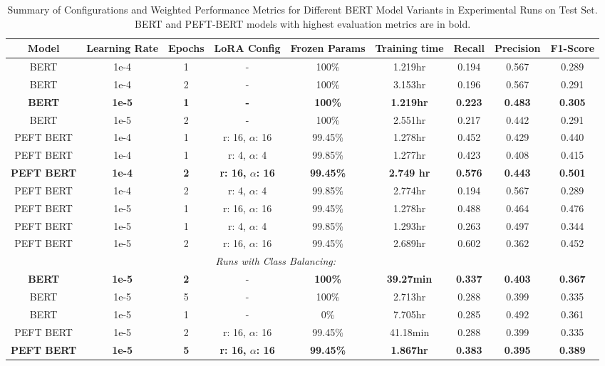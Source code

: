 \documentclass[sigconf, natbib=true]{acmart}
\begin{document}
\begin{table}[h]
\centering
\caption{Summary of Configurations and Weighted Performance Metrics for Different BERT Model Variants in Experimental Runs on Test Set. BERT and PEFT-BERT models with highest evaluation metrics are in bold.}
\label{tab:experimental_runs_test}
\begin{tabular}{c c c c c c c c c}
\toprule
\textbf{Model} & \textbf{Learning Rate} & \textbf{Epochs} & \textbf{LoRA Config} & \textbf{Frozen Params} & \textbf{Training time} & \textbf{Recall} & \textbf{Precision} & \textbf{F1-Score} \\ 
\midrule
BERT & 1e-4 & 1 & - & 100\% & 1.219hr & 0.194 & 0.567 & 0.289 \\ 
BERT & 1e-4 & 2 & - & 100\%  & 3.153hr & 0.196 & 0.567 & 0.291 \\
\textbf{BERT} & \textbf{1e-5} & \textbf{1} & \textbf{-} & \textbf{100\%} & \textbf{1.219hr} & \textbf{0.223} & \textbf{0.483} &  \textbf{0.305} \\ 
BERT & 1e-5 & 2 & - & 100\%  & 2.551hr & 0.217 & 0.442 & 0.291 \\ 
PEFT BERT & 1e-4 & 1 & r: 16, $\alpha$: 16 & 99.45\% & 1.278hr & 0.452 & 0.429 & 0.440\\ 
PEFT BERT & 1e-4 & 1 & r: 4, $\alpha$: 4 & 99.85\% & 1.277hr & 0.423 & 0.408 & 0.415 \\ 
\textbf{PEFT BERT} & \textbf{1e-4} & \textbf{2} & \textbf{r: 16, $\alpha$: 16} & \textbf{99.45\%} & \textbf{2.749 hr} & \textbf{0.576} & \textbf{0.443} &  \textbf{0.501} \\ 
PEFT BERT & 1e-4 & 2 & r: 4, $\alpha$: 4 & 99.85\% & 2.774hr & 0.194 & 0.567 &  0.289 \\ 
PEFT BERT & 1e-5 & 1 & r: 16, $\alpha$: 16 & 99.45\%  & 1.278hr & 0.488 & 0.464 & 0.476 \\ 
PEFT BERT & 1e-5 & 1 & r: 4, $\alpha$: 4 & 99.85\%  & 1.293hr & 0.263 & 0.497 & 0.344 \\ 
PEFT BERT & 1e-5 & 2 & r: 16, $\alpha$: 16 & 99.45\% & 2.689hr & 0.602 & 0.362 &  0.452 \\ 
\midrule
\multicolumn{8}{c}{\textit{Runs with Class Balancing:}} \\
\midrule
\textbf{BERT} & \textbf{1e-5} & \textbf{2} & - & \textbf{100\%} & \textbf{39.27min} & \textbf{0.337} & \textbf{0.403} &\textbf{ 0.367} \\ 
BERT & 1e-5 & 5 & - & 100\%  & 2.713hr & 0.288 & 0.399 & 0.335 \\ 
BERT & 1e-5 & 1 & - & 0\%  & 7.705hr & 0.285 & 0.492 & 0.361 \\ 
PEFT BERT & 1e-5 & 2 & r: 16, $\alpha$: 16 & 99.45\% & 41.18min & 0.288 & 0.399 &  0.335 \\
\textbf{PEFT BERT} & \textbf{1e-5} & \textbf{5} & \textbf{r: 16, $\alpha$: 16} & \textbf{99.45\%} & \textbf{1.867hr} & \textbf{0.383} & \textbf{0.395} & \textbf{0.389}\\
\bottomrule
\end{tabular}
\end{table}
\end{document}
